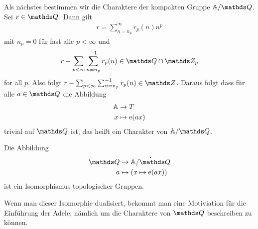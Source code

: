 Als nächstes bestimmen wir die Charaktere der kompakten Gruppe $\A/\Q$.
Sei $r\in \Q$. Dann gilt
\begin{align*}
r=\sum_{n=n_p}^\infty r_p(n)n^p
\end{align*}
mit $n_p=0$ für fast alle $p<\infty$ und
\begin{align*}
r-\sum_{p<\infty} \sum_{n=n_p}^{-1}r_p(n) \in \Q \cap \Z_p
\end{align*}
for all $p$. Also folgt $r-\sum_{p<\infty} \sum_{n=n_p}^{-1}r_p(n) \in \Z$.
Daraus folgt dass für alle $a\in \Q$ die Abbildung
\begin{align*}
\mathbb{A} &\to T\\
x &\mapsto \mathrm{e}(ax)
\end{align*}
trivial auf $\Q$ ist, das heißt ein Charakter von $\A / \Q$.

\begin{thm}
Die Abbildung
\begin{align*}
\Q &\to \hat{\A/\Q}\\
a &\mapsto (x \mapsto \mathrm{e}(ax))
\end{align*}
ist ein Isomorphismus topologischer Gruppen.
\end{thm}
\begin{bem}
Wenn man dieser Isomorphie dualisiert, bekommt man eine Motiviation für die Einführung der Adele, nämlich um die Charaktere von $\Q$ beschreiben zu können.
\end{bem}
